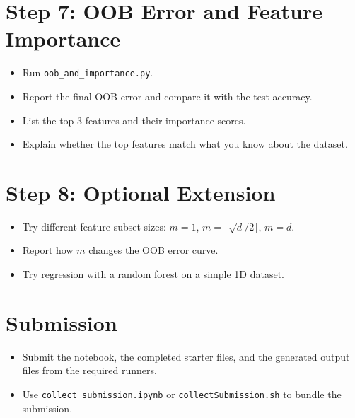 \section*{Step 7: OOB Error and Feature Importance}
\begin{itemize}
  \item Run \texttt{oob\_and\_importance.py}.
  \item Report the final OOB error and compare it with the test accuracy.
  \item List the top-3 features and their importance scores.
  \item Explain whether the top features match what you know about the dataset.
\end{itemize}

\section*{Step 8: Optional Extension}
\begin{itemize}
  \item Try different feature subset sizes: $m = 1$, $m = \lfloor\sqrt{d}/2\rfloor$, $m = d$.
  \item Report how $m$ changes the OOB error curve.
  \item Try regression with a random forest on a simple 1D dataset.
\end{itemize}

\section*{Submission}
\begin{itemize}
  \item Submit the notebook, the completed starter files, and the generated output files from the required runners.
  \item Use \texttt{collect\_submission.ipynb} or \texttt{collectSubmission.sh} to bundle the submission.
\end{itemize}
